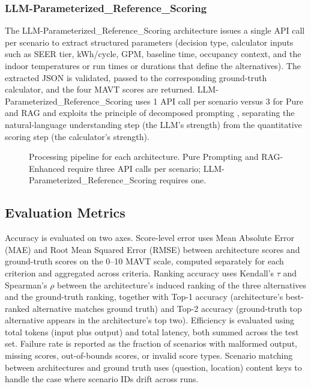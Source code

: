 \documentclass[final,3p,times]{elsarticle}
\begin{document}
\subsubsection{LLM-Parameterized\_Reference\_Scoring}
The LLM-Parameterized\_Reference\_Scoring architecture issues a single API call per scenario to extract structured parameters (decision type, calculator inputs such as SEER tier, kWh/cycle, GPM, baseline time, occupancy context, and the indoor temperatures or run times or durations that define the alternatives). The extracted JSON is validated, passed to the corresponding ground-truth calculator, and the four MAVT scores are returned. LLM-Parameterized\_Reference\_Scoring uses 1 API call per scenario versus 3 for Pure and RAG and exploits the principle of decomposed prompting \cite{khot2023}, separating the natural-language understanding step (the LLM's strength) from the quantitative scoring step (the calculator's strength).

\begin{figure}[t]
\centering
{}
\caption{Processing pipeline for each architecture. Pure Prompting and RAG-Enhanced require three API calls per scenario; LLM-Parameterized\_Reference\_Scoring requires one.}
\label{fig:pipeline}
\end{figure}

\subsection{Evaluation Metrics}
\label{sec:eval-metrics}

Accuracy is evaluated on two axes. Score-level error uses Mean Absolute Error (MAE) and Root Mean Squared Error (RMSE) between architecture scores and ground-truth scores on the 0--10 MAVT scale, computed separately for each criterion and aggregated across criteria. Ranking accuracy uses Kendall's $\tau$ and Spearman's $\rho$ between the architecture's induced ranking of the three alternatives and the ground-truth ranking, together with Top-1 accuracy (architecture's best-ranked alternative matches ground truth) and Top-2 accuracy (ground-truth top alternative appears in the architecture's top two). Efficiency is evaluated using total tokens (input plus output) and total latency, both summed across the test set. Failure rate is reported as the fraction of scenarios with malformed output, missing scores, out-of-bounds scores, or invalid score types. Scenario matching between architectures and ground truth uses (question, location) content keys to handle the case where scenario IDs drift across runs.
\end{document}
